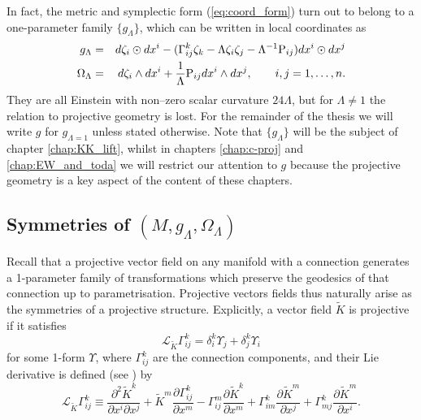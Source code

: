 \begin{rmk}
In fact, the metric and symplectic form (\ref{eq:coord_form}) turn
out to belong to a one-parameter family $\{g_{\Lambda}\}$, which
can be written in local coordinates as 
\begin{eqnarray}
g_{\Lambda} & = &  d\zeta_{i}\odot dx^{i}-(\Gamma_{ij}^{k}\zeta_{k}-\Lambda \zeta_{i}\zeta_{j}-\Lambda^{-1}\mathrm{P}_{ij}) dx^{i}\odot dx^{j}\label{eq:general_g}\\
\Omega_{\Lambda} & = &  d\zeta_{i}\wedge dx^{i}+\frac{1}{\Lambda}\mathrm{P}_{ij} dx^{i}\wedge dx^{j},\qquad i,j=1,\dots ,n.\label{eq:general_omega}
\end{eqnarray}
They are all Einstein with non--zero scalar curvature $24\Lambda$, but for $\Lambda\neq1$ the relation to projective geometry is lost. For the remainder of the thesis we will write $g$ for $g_{\Lambda=1}$ unless stated otherwise. Note that $\{g_\Lambda\}$ will be the subject of chapter \ref{chap:KK_lift}, whilst in chapters \ref{chap:c-proj} and \ref{chap:EW_and_toda} we will restrict our attention to $g$ because the projective geometry is a key aspect of the content of these chapters.
\end{rmk}


 \subsection{Symmetries of $(M,g_{\Lambda},\Omega_{\Lambda})$}

Recall that a projective vector field on any manifold with a connection
generates a 1-parameter family of transformations which preserve the
geodesics of that connection up to parametrisation. Projective vectors
fields thus naturally arise as the symmetries of a projective structure.
Explicitly, a vector field $\tilde{K}$ is projective if it satisfies
\begin{equation}
\mathcal{L}_{\tilde{K}}\Gamma_{ij}^{k}=\delta_{i}^{k}\Upsilon_{j}+\delta_{j}^{k}\Upsilon_{i}\label{eq:proj_transf}
\end{equation}
for some 1-form $\Upsilon$, where $\Gamma_{ij}^{k}$ are the connection
components, and their Lie derivative is defined (see \cite{yano})
by
\begin{equation}
\mathcal{L}_{\tilde{K}}\Gamma_{ij}^{k}\equiv\frac{\partial^{2}\tilde{K}^{k}}{\partial x^{i}\partial x^{j}}+\tilde{K}^{m}\frac{\partial\Gamma_{ij}^{k}}{\partial x^{m}}-\Gamma_{ij}^{m}\frac{\partial \tilde{K}^{k}}{\partial x^{m}}+\Gamma_{im}^{k}\frac{\partial \tilde{K}^{m}}{\partial x^{j}}+\Gamma_{mj}^{k}\frac{\partial \tilde{K}^{m}}{\partial x^{i}}.\label{eq:liederivGamma}
\end{equation}


